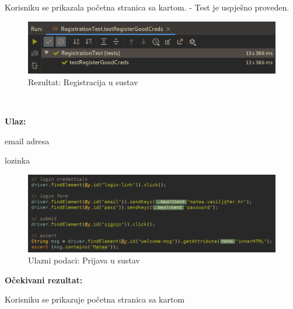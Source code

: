 		
			Korisniku se prikazala početna stranica sa kartom. - Test je uspješno proveden.			


			\begin{figure}[H]
					\includegraphics[scale=0.57]{figures/registe-pass.PNG}
					\centering
					\caption{Rezultat: Registracija u sustav}
					\label{fig:Registracija u sustav}
				\end{figure}
			
			\noindent {}
			
			\
			
			\noindent \textbf{Ulaz:}
			
			\begin{packed_enum}		
				\item email adresa
				\item lozinka
				
				
			\end{packed_enum}

			\begin{figure}[H]
					\includegraphics[scale=0.57]{figures/login-code.PNG}
					\centering
					\caption{Ulazni podaci: Prijava u sustav}
					\label{fig:Prijava u sustav}
				\end{figure}	

			\noindent \textbf{Očekivani rezultat:}
				\begin{packed_enum}
				\item Korisniku se prikazuje početna stranica sa kartom
							
				
			\end{packed_enum}
			
		

